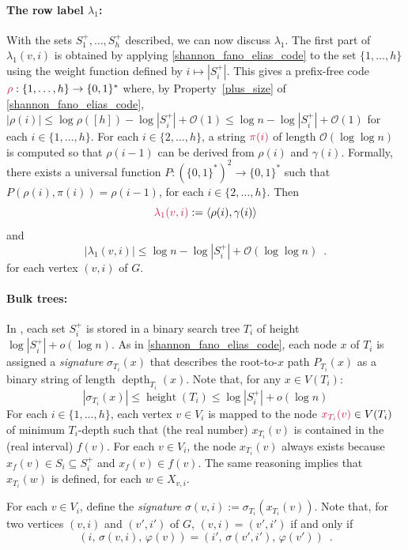 \documentclass{patmorin}
\makeatletter
\renewcommand{\le}{\leqslant}
\newcommand{\defin}[1]{\emph{\textcolor{brightmaroon}{#1}}}
\def\mathcolor#1#{\@mathcolor{#1}}
\def\@mathcolor#1#2#3{%
  \protect\leavevmode
  \begingroup
    \color#1{#2}#3%
  \endgroup
}
\newcommand{\mathdefin}[1]{\mathcolor{brightmaroon}{#1}}
\DeclareMathOperator{\height}{height}
\DeclareMathOperator{\depth}{depth}
\newcommand{\Oh}{\calO}
\newcommand{\calO}{\mathcal{O}}
\makeatother
\begin{document}
  \paragraph{\boldmath The row label $\lambda_1$:}
  With the sets $S^+_1,\ldots,S^+_h$ described, we can now discuss $\lambda_1$.
  The first part of $\lambda_1(v,i)$ is obtained by applying \cref{shannon_fano_elias_code} to the set $\{1,\ldots,h\}$ using the weight function defined by $i \mapsto |S^+_i|$. This gives a prefix-free code $\mathdefin{\rho}:\{1,\ldots,h\}\to\{0,1\}^*$ where, by Property~\ref{plus_size} of \cref{shannon_fano_elias_code}, $|\rho(i)|\le \log\rho([h]) - \log|S^+_i| + \Oh(1)\le \log n - \log|S^+_i| + \Oh(1)$ for each $i\in\{1,\ldots,h\}$.
  For each $i\in\{2,\ldots,h\}$, a string $\mathdefin{\pi(i)}$ of length $\Oh(\log\log n)$ is computed so that $\rho(i-1)$ can be derived from $\rho(i)$ and $\gamma(i)$.  Formally, there exists a universal function $P:(\{0,1\}^*)^2\to\{0,1\}^*$ such that $P(\rho(i),\pi(i))=\rho(i-1)$, for each $i\in\{2,\ldots,h\}$.
  Then
  \[
     \mathdefin{\lambda_1(v,i)}:=\langle \rho(i),\gamma(i)\rangle
  \]
  and 
  \begin{equation}  
    |\lambda_1(v,i)|\le \log n - \log |S^+_i| + \Oh(\log\log n) \enspace .
    \label{lambda_one_length}
  \end{equation}
  for each vertex $(v,i)$ of $G$.


  \paragraph{Bulk trees:}
  In \cite{dujmovic.esperet.ea:adjacency}, each set $S^+_i$ is stored in a binary search tree $T_i$ of height $\log|S^+_i|+o(\log n)$.
  As in \cref{shannon_fano_elias_code}, each node $x$ of $T_i$ is assigned a \defin{signature} \defin{$\sigma_{T_i}(x)$} that describes the root-to-$x$ path $P_{T_i}(x)$ as a binary string of length $\depth_{T_i}(x)$.
  Note that, for any $x\in V(T_i)$:
  \[
    |\sigma_{T_i}(x)| \le \height(T_i) \le \log|S^+_i|+o(\log n)
  \]
  For each $i\in\{1,\ldots,h\}$, each vertex $v\in V_i$ is mapped to the node $\mathdefin{x_{T_i}(v)}\in V(T_i)$ of minimum $T_i$-depth such that (the real number) $x_{T_i}(v)$ is contained in the (real interval) $f(v)$.
  For each $v\in V_i$, the node $x_{T_i}(v)$ always exists because $x_f(v)\in S_i\subseteq S_i^+$ and $x_f(v)\in f(v)$.  The same reasoning implies that $x_{T_i}(w)$ is defined, for each $w\in X_{v,i}$.



  For each $v\in V_i$, define the \defin{signature} $\sigma(v,i):=\sigma_{T_i}(x_{T_i}(v))$.  Note that, for two vertices $(v,i)$ and $(v',i')$ of $G$, $(v,i)=(v',i')$ if and only if
  \begin{equation}
     (i,\,\sigma(v,i),\,\varphi(v)) = (i',\,\sigma(v',i'),\,\varphi(v')) \enspace .
     \label{ps_identity}
  \end{equation}
\end{document}
